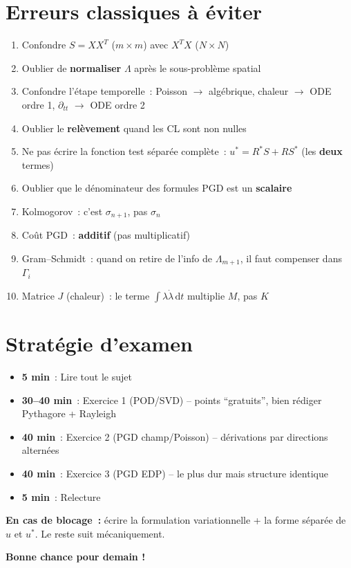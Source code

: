 \documentclass[11pt,a4paper]{article}
\begin{document}
\section{Erreurs classiques \`a \'eviter}

\begin{warningbox}
\begin{enumerate}[nosep]
\item Confondre $S=XX^T$ ($m\!\times\!m$) avec $X^TX$ ($N\!\times\!N$)
\item Oublier de \textbf{normaliser} $\Lambda$ apr\`es le sous-probl\`eme spatial
\item Confondre l'\'etape temporelle~: Poisson $\to$ alg\'ebrique, chaleur $\to$ ODE ordre 1, $\partial_{tt}$ $\to$ ODE ordre 2
\item Oublier le \textbf{rel\`evement} quand les CL sont non nulles
\item Ne pas \'ecrire la fonction test s\'epar\'ee compl\`ete~: $u^* = R^*S + RS^*$ (les \textbf{deux} termes)
\item Oublier que le d\'enominateur des formules PGD est un \textbf{scalaire}
\item Kolmogorov~: c'est $\sigma_{n+1}$, pas $\sigma_n$
\item Co\^ut PGD~: \textbf{additif} (pas multiplicatif)
\item Gram--Schmidt~: quand on retire de l'info de $\Lambda_{m+1}$, il faut compenser dans $\Gamma_i$
\item Matrice $J$ (chaleur)~: le terme $\int\lambda\dot{\lambda}\,\mathrm{d}t$ multiplie $M$, pas $K$
\end{enumerate}
\end{warningbox}

\section{Strat\'egie d'examen}

\begin{tipbox}
\begin{itemize}[nosep]
\item \textbf{5 min}~: Lire tout le sujet
\item \textbf{30--40 min}~: Exercice 1 (POD/SVD) -- points ``gratuits'', bien r\'ediger Pythagore + Rayleigh
\item \textbf{40 min}~: Exercice 2 (PGD champ/Poisson) -- d\'erivations par directions altern\'ees
\item \textbf{40 min}~: Exercice 3 (PGD EDP) -- le plus dur mais structure identique
\item \textbf{5 min}~: Relecture
\end{itemize}
\textbf{En cas de blocage~:} \'ecrire la formulation variationnelle + la forme s\'epar\'ee de $u$ et $u^*$. Le reste suit m\'ecaniquement.
\end{tipbox}

\vfill
\begin{center}
\Large\textbf{Bonne chance pour demain !}
\end{center}
\end{document}

